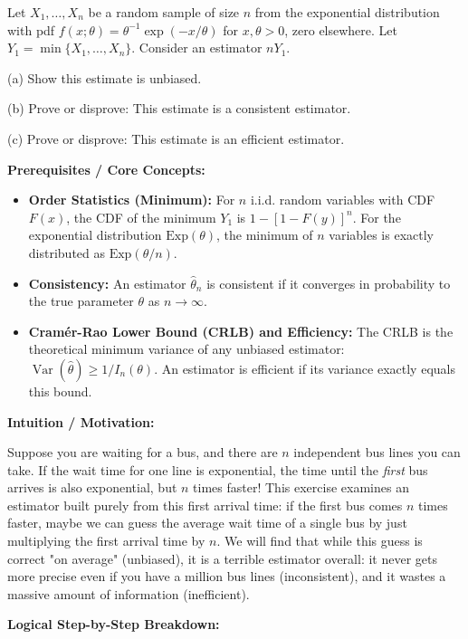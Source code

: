\begin{exercise}\label{probability:2015:4}
Let $X_1, \ldots, X_n$ be a random sample of size $n$ from the exponential distribution with pdf $f(x; \theta) = \theta^{-1}\exp(-x/\theta)$ for $x, \theta > 0$, zero elsewhere. Let $Y_1 = \min\{X_1, \dots, X_n\}$. Consider an estimator $nY_1$.

(a) Show this estimate is unbiased.

(b) Prove or disprove: This estimate is a consistent estimator.

(c) Prove or disprove: This estimate is an efficient estimator.
\end{exercise}

\begin{solution}
\textbf{Prerequisites / Core Concepts:}
\begin{itemize}
    \item \textbf{Order Statistics (Minimum):} For $n$ i.i.d. random variables with CDF $F(x)$, the CDF of the minimum $Y_1$ is $1 - [1 - F(y)]^n$. For the exponential distribution $\text{Exp}(\theta)$, the minimum of $n$ variables is exactly distributed as $\text{Exp}(\theta/n)$.
    \item \textbf{Consistency:} An estimator $\hat{\theta}_n$ is consistent if it converges in probability to the true parameter $\theta$ as $n \to \infty$.
    \item \textbf{Cramér-Rao Lower Bound (CRLB) and Efficiency:} The CRLB is the theoretical minimum variance of any unbiased estimator: $\operatorname{Var}(\hat{\theta}) \geq 1/I_n(\theta)$. An estimator is efficient if its variance exactly equals this bound.
\end{itemize}

\textbf{Intuition / Motivation:}

Suppose you are waiting for a bus, and there are $n$ independent bus lines you can take. If the wait time for one line is exponential, the time until the \textit{first} bus arrives is also exponential, but $n$ times faster! This exercise examines an estimator built purely from this first arrival time: if the first bus comes $n$ times faster, maybe we can guess the average wait time of a single bus by just multiplying the first arrival time by $n$. We will find that while this guess is correct "on average" (unbiased), it is a terrible estimator overall: it never gets more precise even if you have a million bus lines (inconsistent), and it wastes a massive amount of information (inefficient).

\textbf{Logical Step-by-Step Breakdown:}


\end{solution}
